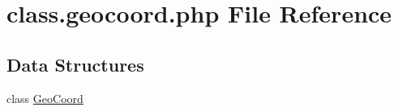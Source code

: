 \hypertarget{class_8geocoord_8php}{}\section{class.\+geocoord.\+php File Reference}
\label{class_8geocoord_8php}
\subsection*{Data Structures}
\begin{DoxyCompactItemize}
\item 
class \hyperlink{class_geo_coord}{Geo\+Coord}
\end{DoxyCompactItemize}
